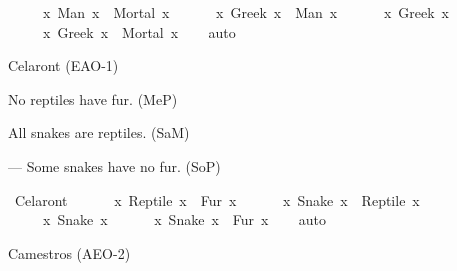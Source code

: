 \begin{isabellebody}
\begin{exercise}[subtitle=Silogizmi]
\ \ \ \ {\isacharparenleft}{\kern0pt}{\isasymforall}\ x{\isachardot}{\kern0pt}\ Man\ x\ {\isasymlongrightarrow}\ Mortal\ x{\isacharparenright}{\kern0pt}\ {\isasymand}\isanewline
\ \ \ \ {\isacharparenleft}{\kern0pt}{\isasymforall}\ x{\isachardot}{\kern0pt}\ Greek\ x\ {\isasymlongrightarrow}\ Man\ x{\isacharparenright}{\kern0pt}\ {\isasymand}\isanewline
\ \ \ \ {\isacharparenleft}{\kern0pt}{\isasymexists}\ x{\isachardot}{\kern0pt}\ Greek\ x{\isacharparenright}{\kern0pt}\ {\isasymlongrightarrow}\isanewline
\ \ \ \ {\isacharparenleft}{\kern0pt}{\isasymexists}\ x{\isachardot}{\kern0pt}\ Greek\ x\ {\isasymand}\ Mortal\ x{\isacharparenright}{\kern0pt}{\isachardoublequoteclose}\isanewline
%
\isadelimproof
\ \ %
\endisadelimproof
%
\isatagproof
{}\isamarkupfalse%
\ auto%
\endisatagproof
{\isafoldproof}%
%
\isadelimproof
%
\endisadelimproof
%
\begin{isamarkuptext}%
Celaront (EAO-1)%
\end{isamarkuptext}\isamarkuptrue%
%
\begin{isamarkuptext}%
No reptiles have fur. (MeP)%
\end{isamarkuptext}\isamarkuptrue%
%
\begin{isamarkuptext}%
All snakes are reptiles. (SaM)%
\end{isamarkuptext}\isamarkuptrue%
%
\begin{isamarkuptext}%
— Some snakes have no fur. (SoP)%
\end{isamarkuptext}\isamarkuptrue%
\isamarkupfalse%
\ Celaront{\isacharcolon}{\kern0pt}\ {\isachardoublequoteopen}\isanewline
\ \ \ \ {\isacharparenleft}{\kern0pt}{\isasymnexists}\ x{\isachardot}{\kern0pt}\ Reptile\ x\ {\isasymand}\ Fur\ x{\isacharparenright}{\kern0pt}\ {\isasymand}\isanewline
\ \ \ \ {\isacharparenleft}{\kern0pt}{\isasymforall}\ x{\isachardot}{\kern0pt}\ Snake\ x\ {\isasymlongrightarrow}\ Reptile\ x{\isacharparenright}{\kern0pt}\ {\isasymand}\isanewline
\ \ \ \ {\isacharparenleft}{\kern0pt}{\isasymexists}\ x{\isachardot}{\kern0pt}\ Snake\ x{\isacharparenright}{\kern0pt}\ {\isasymlongrightarrow}\isanewline
\ \ \ \ {\isacharparenleft}{\kern0pt}{\isasymexists}\ x{\isachardot}{\kern0pt}\ Snake\ x\ {\isasymand}\ {\isasymnot}Fur\ x{\isacharparenright}{\kern0pt}{\isachardoublequoteclose}\isanewline
%
\isadelimproof
\ \ %
\endisadelimproof
%
\isatagproof
{}\isamarkupfalse%
\ auto%
\endisatagproof
{\isafoldproof}%
%
\isadelimproof
%
\endisadelimproof
%
\begin{isamarkuptext}%
Camestros (AEO-2)%
\end{isamarkuptext}\isamarkuptrue%

\end{exercise}
\end{isabellebody}
